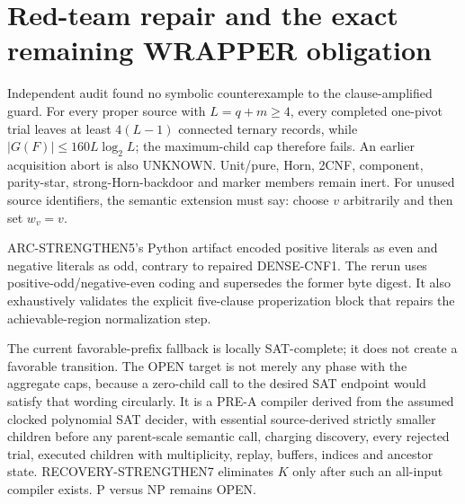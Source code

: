 \section{Red-team repair and the exact remaining WRAPPER obligation}
Independent audit found no symbolic counterexample to the clause-amplified
guard.  For every proper source with $L=q+m\ge4$, every completed one-pivot
trial leaves at least $4(L-1)$ connected ternary records, while
$|G(F)|\le160L\log_2L$; the maximum-child cap therefore fails.  An earlier
acquisition abort is also UNKNOWN.  Unit/pure, Horn, 2CNF, component,
parity-star, strong-Horn-backdoor and marker members remain inert.  For unused
source identifiers, the semantic extension must say: choose $v$ arbitrarily
and then set $w_v=v$.

ARC-STRENGTHEN5's Python artifact encoded positive literals as even and
negative literals as odd, contrary to repaired DENSE-CNF1.  The rerun uses
positive-odd/negative-even coding and supersedes the former byte digest.  It
also exhaustively validates the explicit five-clause properization block that
repairs the achievable-region normalization step.

The current favorable-prefix fallback is locally SAT-complete; it does not
create a favorable transition.  The OPEN target is not merely any phase with
the aggregate caps, because a zero-child call to the desired SAT endpoint
would satisfy that wording circularly.  It is a PRE-A compiler derived from
the assumed clocked polynomial SAT decider, with essential source-derived
strictly smaller children before any parent-scale semantic call, charging
discovery, every rejected trial, executed children with multiplicity, replay,
buffers, indices and ancestor state.  RECOVERY-STRENGTHEN7 eliminates $K$
only after such an all-input compiler exists.  P versus NP remains OPEN.
